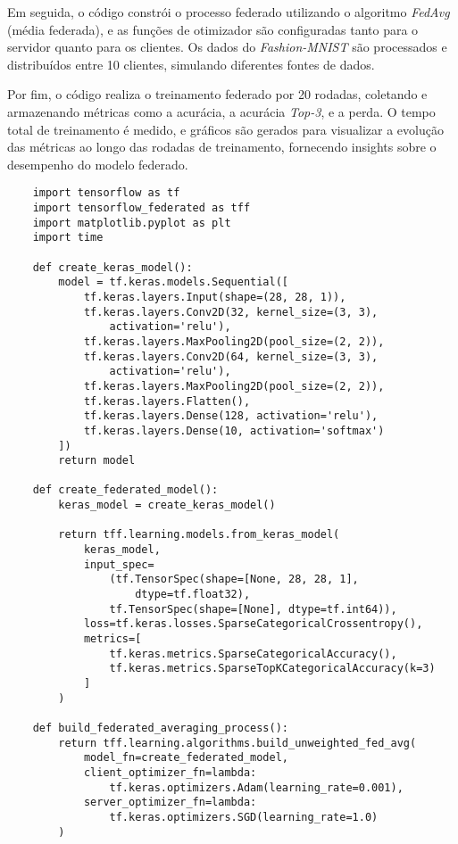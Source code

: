 Em seguida, o código constrói o processo federado utilizando o algoritmo \textit{FedAvg} (média federada), e as funções de otimizador são configuradas tanto para o servidor quanto para os clientes. Os dados do \textit{Fashion-MNIST} são processados e distribuídos entre 10 clientes, simulando diferentes fontes de dados.

Por fim, o código realiza o treinamento federado por 20 rodadas, coletando e armazenando métricas como a acurácia, a acurácia \textit{Top-3}, e a perda. O tempo total de treinamento é medido, e gráficos são gerados para visualizar a evolução das métricas ao longo das rodadas de treinamento, fornecendo insights sobre o desempenho do modelo federado.

\begin{lstlisting}
    import tensorflow as tf
    import tensorflow_federated as tff
    import matplotlib.pyplot as plt
    import time

    def create_keras_model():
        model = tf.keras.models.Sequential([
            tf.keras.layers.Input(shape=(28, 28, 1)),
            tf.keras.layers.Conv2D(32, kernel_size=(3, 3), 
                activation='relu'),
            tf.keras.layers.MaxPooling2D(pool_size=(2, 2)),
            tf.keras.layers.Conv2D(64, kernel_size=(3, 3), 
                activation='relu'),
            tf.keras.layers.MaxPooling2D(pool_size=(2, 2)),
            tf.keras.layers.Flatten(),
            tf.keras.layers.Dense(128, activation='relu'),
            tf.keras.layers.Dense(10, activation='softmax')
        ])
        return model

    def create_federated_model():
        keras_model = create_keras_model()

        return tff.learning.models.from_keras_model(
            keras_model,
            input_spec=
                (tf.TensorSpec(shape=[None, 28, 28, 1], 
                    dtype=tf.float32),
                tf.TensorSpec(shape=[None], dtype=tf.int64)),
            loss=tf.keras.losses.SparseCategoricalCrossentropy(),
            metrics=[
                tf.keras.metrics.SparseCategoricalAccuracy(),
                tf.keras.metrics.SparseTopKCategoricalAccuracy(k=3)
            ]
        )

    def build_federated_averaging_process():
        return tff.learning.algorithms.build_unweighted_fed_avg(
            model_fn=create_federated_model,
            client_optimizer_fn=lambda: 
                tf.keras.optimizers.Adam(learning_rate=0.001),
            server_optimizer_fn=lambda: 
                tf.keras.optimizers.SGD(learning_rate=1.0)
        )


\end{lstlisting}
